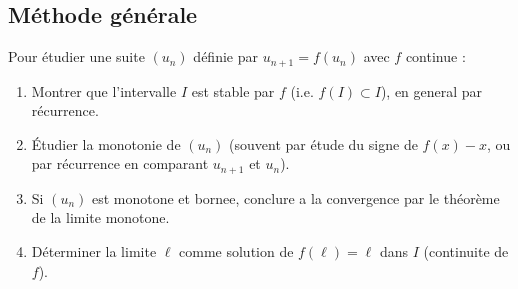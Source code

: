 \subsection{Méthode générale}

Pour étudier une suite $(u_n)$ définie par $u_{n+1} = f(u_n)$ avec $f$ continue :
\begin{enumerate}
  \item Montrer que l'intervalle $I$ est stable par $f$ (i.e. $f(I) \subset I$), en general par récurrence.
  \item Étudier la monotonie de $(u_n)$ (souvent par étude du signe de $f(x)-x$, ou par récurrence en comparant $u_{n+1}$ et $u_n$).
  \item Si $(u_n)$ est monotone et bornee, conclure a la convergence par le théorème de la limite monotone.
  \item Déterminer la limite $\ell$ comme solution de $f(\ell) = \ell$ dans $I$ (continuite de $f$).
\end{enumerate}




